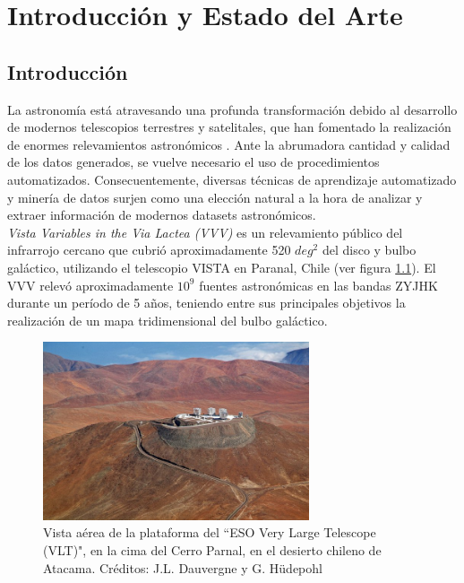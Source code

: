 \chapter{Introducción y Estado del Arte}

\section {Introducción}

La astronomía está atravesando una profunda transformación debido al desarrollo de modernos telescopios terrestres y satelitales, que han fomentado la realización de enormes relevamientos astronómicos \cite{Benjamin_2003} \cite{Skrutskie_2006} \cite{gaia} \cite{ogle}. Ante la abrumadora cantidad y calidad de los datos generados, se vuelve necesario el uso de procedimientos automatizados. Consecuentemente, diversas técnicas de aprendizaje automatizado y minería de datos surjen como una elección natural a la hora de analizar y extraer información de modernos datasets astronómicos. \cite{Richards_2011} \cite{303d9825f1794a8b86d692ee85c9a602}\\

\textit{Vista Variables in the Via Lactea (VVV)} es un relevamiento público del infrarrojo cercano que cubrió aproximadamente 520 $deg^2$ del disco y bulbo galáctico, utilizando el telescopio VISTA en Paranal, Chile \cite{vvv} (ver figura \ref{fig:vvv_telescope}). El VVV relevó aproximadamente $10^9$ fuentes astronómicas en las bandas ZYJHK durante un período de 5 años, teniendo entre sus principales objetivos la realización de un mapa tridimensional del bulbo galáctico. \\

\begin{figure}[h!]
\begin{center}
\includegraphics[width=0.7\textwidth]{Kap1/telescope.jpg}
\end{center}
\caption[short]{Vista aérea de la plataforma del ``ESO Very Large Telescope (VLT)", en la cima del Cerro Parnal, en el desierto chileno de Atacama. Créditos: J.L. Dauvergne  y G. Hüdepohl }
\label{fig:vvv_telescope}
\end{figure}


